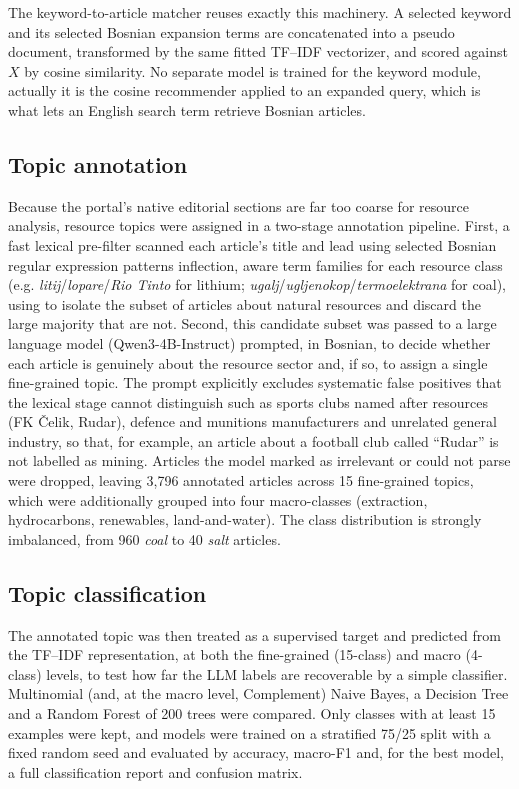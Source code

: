 \documentclass[fleqn,10pt]{wlscirep}
\begin{document}
The keyword-to-article matcher reuses exactly this machinery. A selected keyword and its selected Bosnian expansion terms are concatenated into a pseudo document, transformed by the same fitted TF--IDF vectorizer, and scored against $X$ by cosine similarity. No separate model is trained for the keyword module, actually it is the cosine recommender applied to an expanded query, which is what lets an English search term retrieve Bosnian articles.

\subsection*{Topic annotation}

Because the portal's native editorial sections are far too coarse for resource analysis, resource topics were assigned in a two-stage annotation pipeline. First, a fast lexical pre-filter scanned each article's title and lead using selected Bosnian regular expression patterns inflection, aware term families for each resource class (e.g. \emph{litij}/\emph{lopare}/\emph{Rio Tinto} for lithium; \emph{ugalj}/\emph{ugljenokop}/\emph{termoelektrana} for coal), using to isolate the subset of articles about natural resources and discard the large majority that are not. Second, this candidate subset was passed to a large language model (Qwen3-4B-Instruct) prompted, in Bosnian, to decide whether each article is genuinely about the resource sector and, if so, to assign a single fine-grained topic. The prompt explicitly excludes systematic false positives that the lexical stage cannot distinguish such as sports clubs named after resources (FK Čelik, Rudar), defence and munitions manufacturers and unrelated general industry, so that, for example, an article about a football club called ``Rudar'' is not labelled as mining. Articles the model marked as irrelevant or could not parse were dropped, leaving 3{,}796 annotated articles across 15 fine-grained topics, which were additionally grouped into four macro-classes (extraction, hydrocarbons, renewables, land-and-water). The class distribution is strongly imbalanced, from 960 \emph{coal} to 40 \emph{salt} articles.

\subsection*{Topic classification}

The annotated topic was then treated as a supervised target and predicted from the TF--IDF representation, at both the fine-grained (15-class) and macro (4-class) levels, to test how far the LLM labels are recoverable by a simple classifier. Multinomial (and, at the macro level, Complement) Naive Bayes, a Decision Tree and a Random Forest of 200 trees \cite{breiman2001random} were compared. Only classes with at least 15 examples were kept, and models were trained on a stratified 75/25 split with a fixed random seed and evaluated by accuracy, macro-F1 and, for the best model, a full classification report and confusion matrix.
\end{document}
